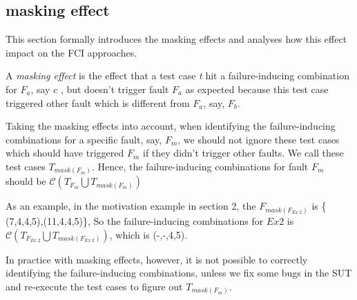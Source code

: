 \documentclass{sig-alternate}
\begin{document}
%

\subsection{masking effect}
This section formally introduces the masking effects and analyses how this effect impact on the FCI approaches.
\begin{definition}
A \emph{masking effect} is the effect that a test case \emph{t} hit a failure-inducing combination for $F_{a}$, say $c$ , but doesn't trigger fault $F_{a}$ as expected because this test case triggered other fault which is different from $F_{a}$, say, $F_{b}$.

\end{definition}

Taking the masking effects into account, when identifying the failure-inducing combinations for a specific fault, say, $F_{m}$, we should not ignore these test cases which should have triggered $F_{m}$ if they didn't trigger other faults. We call these test cases $T_{mask(F_{m})}$. Hence, the failure-inducing combinations for fault $F_{m}$ should be $\mathcal{C}(T_{F_{m}} \bigcup T_{mask(F_{m})})$


As an example, in the motivation example in section 2, the $F_{mask(F_{Ex\ 2})}$  is \{ (7,4,4,5),(11,4,4,5)\}, So the failure-inducing combinations for $Ex 2$ is $\mathcal{C}(T_{F_{Ex\ 2}} \bigcup T_{mask(F_{Ex\ 2})})$, which is (-,-,4,5).

In practice with masking effects, however, it is not possible to correctly identifying the failure-inducing combinations, unless we fix some bugs in the SUT and re-execute the test cases to figure out $T_{mask(F_{m})}$.
\end{document}
